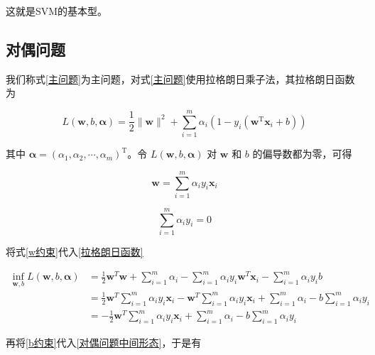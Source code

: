 \documentclass{ctexart}
\begin{document}
	这就是SVM的基本型。
	
	\subsection{对偶问题}
	
	我们称式\eqref{主问题}为主问题，对式\eqref{主问题}使用拉格朗日乘子法，其拉格朗日函数为
	
	\begin{equation}
		L(\boldsymbol{w}, b, \boldsymbol{\alpha})=\frac{1}{2}\|\boldsymbol{w}\|^{2}+\sum_{i=1}^{m} \alpha_{i}\left(1-y_{i}\left(\boldsymbol{w}^{\mathrm{T}} \boldsymbol{x}_{i}+b\right)\right)
		\label{拉格朗日函数}
	\end{equation}

	其中 $\boldsymbol{\alpha}=(\alpha_{1},\alpha_{2},\cdots,\alpha_{m})^\mathrm{T}$。令 $L(\boldsymbol{w}, b, \boldsymbol{\alpha})$ 对 $\boldsymbol{w}$ 和 $b$ 的偏导数都为零，可得
	
	\begin{equation}
		\boldsymbol{w}=\sum_{i=1}^{m} \alpha_{i} y_{i} \boldsymbol{x}_{i}
		\label{w约束}
	\end{equation}
	
	\begin{equation}
		\sum_{i=1}^{m} \alpha_{i} y_{i}=0
		\label{b约束}
	\end{equation}

	将式\eqref{w约束}代入\eqref{拉格朗日函数}
	
	\begin{equation}
		\begin{aligned}
			\inf _{\boldsymbol{w}, b} L(\boldsymbol{w}, b, \boldsymbol{\alpha}) &=\frac{1}{2} \boldsymbol{w}^{T} \boldsymbol{w}+\sum_{i=1}^{m} \alpha_{i}-\sum_{i=1}^{m} \alpha_{i} y_{i} \boldsymbol{w}^{T} \boldsymbol{x}_{i}-\sum_{i=1}^{m} \alpha_{i} y_{i} b \\
			&=\frac{1}{2} \boldsymbol{w}^{T} \sum_{i=1}^{m} \alpha_{i} y_{i} \boldsymbol{x}_{i}-\boldsymbol{w}^{T} \sum_{i=1}^{m} \alpha_{i} y_{i} \boldsymbol{x}_{i}+\sum_{i=1}^{m} \alpha_{i}-b \sum_{i=1}^{m} \alpha_{i} y_{i} \\
			&=-\frac{1}{2} \boldsymbol{w}^{T} \sum_{i=1}^{m} \alpha_{i} y_{i} \boldsymbol{x}_{i}+\sum_{i=1}^{m} \alpha_{i}-b \sum_{i=1}^{m} \alpha_{i} y_{i}
		\end{aligned}
		\label{对偶问题中间形态}
	\end{equation}

	再将\eqref{b约束}代入\eqref{对偶问题中间形态}，于是有
	
\end{document}
